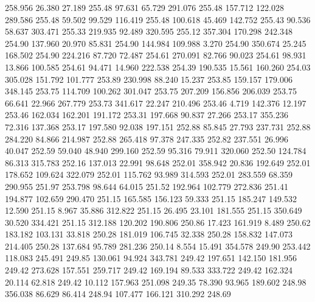  258.956   26.380   27.189       255.48
  97.631   65.729  291.076       255.48
 157.712  122.028  289.586       255.48
  59.502   99.529  116.419       255.48
 100.618   45.469  142.752       255.43
  90.536   58.637  303.471       255.33
 219.935   92.489  320.595       255.12
 357.304  170.298  242.348       254.90
 137.960   20.970   85.831       254.90
 144.984  109.988    3.270       254.90
 350.674   25.245  168.502       254.90
 224.216   87.720   72.487       254.61
 270.091   82.766   90.023       254.61
  98.931   13.866  100.585       254.61
  94.471   14.960  222.538       254.39
 190.535   15.561  160.260       254.03
 305.028  151.792  101.777       253.89
 230.998   88.240   15.237       253.85
 159.157  179.006  348.145       253.75
 114.709  100.262  301.047       253.75
 207.209  156.856  206.039       253.75
  66.641   22.966  267.779       253.73
 341.617   22.247  210.496       253.46
   4.719  142.376   12.197       253.46
 162.034  162.201  191.172       253.31
 197.668   90.837   27.266       253.17
 355.236   72.316  137.368       253.17
 197.580   92.038  197.151       252.88
  85.845   27.793  237.731       252.88
 284.220   84.866  214.987       252.88
 265.418   97.378  247.335       252.82
 237.551   26.996   40.047       252.59
  59.040   48.940  299.160       252.59
  95.316   79.911  320.060       252.50
 124.784   86.313  315.783       252.16
 137.013   22.991   98.648       252.01
 358.942   20.836  192.649       252.01
 178.652  109.624  322.079       252.01
 115.762   93.989  314.593       252.01
 283.559   68.359  290.955       251.97
 253.798   98.644   64.015       251.52
 192.964  102.779  272.836       251.41
 194.877  102.659  290.470       251.15
 165.585  156.123   59.333       251.15
 185.247  149.532   12.590       251.15
   8.967   35.886  312.822       251.15
  26.495   23.101  181.555       251.15
 350.649   30.520  334.421       251.15
 312.188  120.202  190.806       250.86
  17.423  161.919    8.489       250.62
 183.182  103.131   33.818       250.28
 181.019  106.745   32.338       250.28
 158.832  147.073  214.405       250.28
 137.684   95.789  281.236       250.14
   8.554   15.491  354.578       249.90
 253.442  118.083  245.491       249.85
 130.061   94.924  343.781       249.42
 197.651  142.150  181.956       249.42
 273.628  157.551  259.717       249.42
 169.194   89.533  333.722       249.42
 162.324   20.114   62.818       249.42
  10.112  157.963  251.098       249.35
  78.390   93.965  189.602       248.98
 356.038   86.629   86.414       248.94
 107.477  166.121  310.292       248.69
